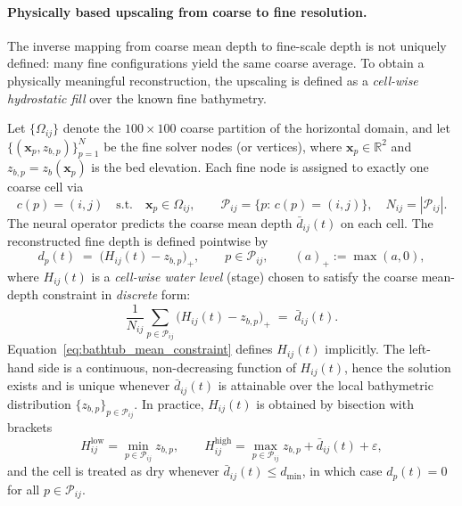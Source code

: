 \paragraph{Physically based upscaling from coarse to fine resolution.}
The inverse mapping from coarse mean depth to fine-scale depth is not uniquely defined: many fine configurations yield the same coarse average. To obtain a physically meaningful reconstruction, the upscaling is defined as a \emph{cell-wise hydrostatic fill} over the known fine bathymetry.

Let $\{\Omega_{ij}\}$ denote the $100\times 100$ coarse partition of the horizontal domain, and let $\{(\mathbf{x}_p,z_{b,p})\}_{p=1}^{N}$ be the fine solver nodes (or vertices), where $\mathbf{x}_p\in\mathbb{R}^2$ and $z_{b,p}=z_b(\mathbf{x}_p)$ is the bed elevation. Each fine node is assigned to exactly one coarse cell via
\begin{equation}
c(p)= (i,j)\quad \text{s.t.}\quad \mathbf{x}_p\in\Omega_{ij}, 
\qquad 
\mathcal{P}_{ij}=\{p:\,c(p)=(i,j)\},\quad N_{ij}=|\mathcal{P}_{ij}|.
\end{equation}
The neural operator predicts the coarse mean depth $\bar d_{ij}(t)$ on each cell. The reconstructed fine depth is defined pointwise by
\begin{equation}
d_p(t) \;=\; \big(H_{ij}(t)-z_{b,p}\big)_+,
\qquad p\in\mathcal{P}_{ij},
\qquad (a)_+ := \max(a,0),
\label{eq:bathtub_pointwise}
\end{equation}
where $H_{ij}(t)$ is a \emph{cell-wise water level} (stage) chosen to satisfy the coarse mean-depth constraint in \emph{discrete} form:
\begin{equation}
\frac{1}{N_{ij}}\sum_{p\in\mathcal{P}_{ij}} \big(H_{ij}(t)-z_{b,p}\big)_+ \;=\; \bar d_{ij}(t).
\label{eq:bathtub_mean_constraint}
\end{equation}
Equation~\eqref{eq:bathtub_mean_constraint} defines $H_{ij}(t)$ implicitly. The left-hand side is a continuous, non-decreasing function of $H_{ij}(t)$, hence the solution exists and is unique whenever $\bar d_{ij}(t)$ is attainable over the local bathymetric distribution $\{z_{b,p}\}_{p\in\mathcal{P}_{ij}}$. In practice, $H_{ij}(t)$ is obtained by bisection with brackets
\begin{equation}
H_{ij}^{\mathrm{low}} = \min_{p\in\mathcal{P}_{ij}} z_{b,p},
\qquad
H_{ij}^{\mathrm{high}} = \max_{p\in\mathcal{P}_{ij}} z_{b,p} + \bar d_{ij}(t) + \varepsilon,
\end{equation}
and the cell is treated as dry whenever $\bar d_{ij}(t)\le d_{\min}$, in which case $d_p(t)=0$ for all $p\in\mathcal{P}_{ij}$.

